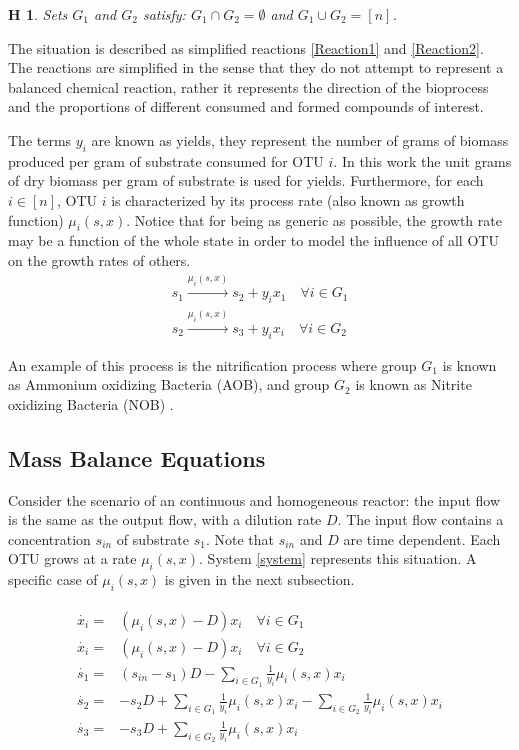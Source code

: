 \documentclass[3p,times]{elsarticle}
\newtheorem{hypo}{H}
\begin{document}
\begin{hypo}  Sets $G_1$ and $G_2$ satisfy: $G_1 \cap G_2 = \emptyset$ and $G_1 \cup G_2 = [n]$. 
\end{hypo}

The situation is described as simplified reactions \eqref{Reaction1} and \eqref{Reaction2}. The reactions are simplified in the sense that they do not attempt to represent a balanced chemical reaction, rather it represents the direction of the bioprocess and the proportions of different consumed and formed compounds of interest. 

The terms $y_i$ are known as yields, they represent the number of grams of biomass produced per gram of substrate consumed for OTU $i$. In this work the unit grams of dry biomass per gram of substrate is used for yields. Furthermore, for each $ i \in [n]$, OTU $i$ is characterized by its process rate (also known as growth function) $\mu_i(s,x)$. Notice that for being as generic as possible, the growth rate may be a function of the whole state in order to model the influence of all OTU on the growth rates of others.
\begin{align}
\label{Reaction1} \tag{R G1} 	s_1 \stackrel{\mu_i(s,x)}{\longrightarrow} s_2 + y_ix_1 \quad \forall i \in G_1 \\
\label{Reaction2} \tag{R G2} s_2\stackrel{\mu_i(s,x)}{\longrightarrow} s_3 + y_ix_i \quad \forall i \in G_2
\end{align}

An example of this process is the nitrification process where group $G_1$ is known as Ammonium oxidizing Bacteria (AOB), and group $G_2$ is known as Nitrite oxidizing Bacteria (NOB) \cite{SHARMA1977897}.
\subsection{Mass Balance Equations}

Consider the scenario of an continuous and homogeneous reactor: the input flow is the same as the output flow, with a dilution rate $D$. The input flow contains a concentration $s_{in}$ of substrate $s_1$. Note that $s_{in}$ and $D$ are time dependent. Each OTU grows at a rate $\mu_i(s,x)$. System \eqref{system} represents this situation. A specific case of $\mu_i(s,x)$ is given in the next subsection. 

\begin{align} 
\label{system}
\begin{array}{cl}
\dot{x_i} =& \left(\mu_i(s,x) -D \right)x_i \quad \forall i \in G_1\\
\dot{x_i} =& \left(\mu_i(s,x) -D \right)x_i \quad \forall i \in G_2 \\
\dot{s_1} =& \displaystyle (s_{in}-s_1)D-\sum\limits_{i\in G_1} \frac{1}{y_i}\mu_i(s,x) x_i  \\
\dot{s_2} = & \displaystyle -s_2D+\sum\limits_{i\in G_1}\frac{1}{y_i}\mu_i(s,x)x_i 		-\sum\limits_{i\in G_2}\frac{1}{y_i}\mu_i(s,x) x_i  \\
\dot{s_3} =&  \displaystyle -s_3D+\sum\limits_{i\in G_2}\frac{1}{y_i}\mu_i(s,x) x_i 
\end{array}
\end{align}	
\end{document}
